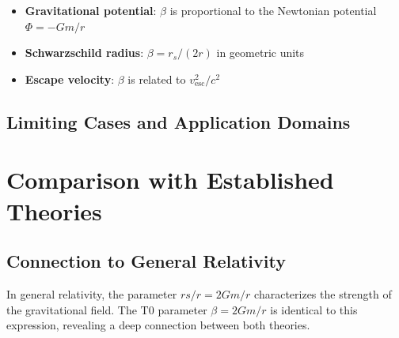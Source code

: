 	\begin{itemize}
		\item \textbf{Gravitational potential}: $\beta$ is proportional to the Newtonian potential $\Phi = -Gm/r$
		\item \textbf{Schwarzschild radius}: $\beta = r_s/(2r)$ in geometric units
		\item \textbf{Escape velocity}: $\beta$ is related to $v_{\text{esc}}^2/c^2$
	\end{itemize}
	
	\subsection{Limiting Cases and Application Domains}
	\label{subsec:limiting_cases}
	
	\begin{table}[htbp]
		\centering
		\caption{Typical $\beta$-values for various physical systems}
		\label{tab:beta_values}
	\end{table}
	
	\section{Comparison with Established Theories}
	\label{sec:theory_comparison}
	
	\subsection{Connection to General Relativity}
	\label{subsec:gr_connection}
	
	In general relativity, the parameter $rs/r = 2Gm/r$ characterizes the strength of the gravitational field. The T0 parameter $\beta = 2Gm/r$ is identical to this expression, revealing a deep connection between both theories.
	
